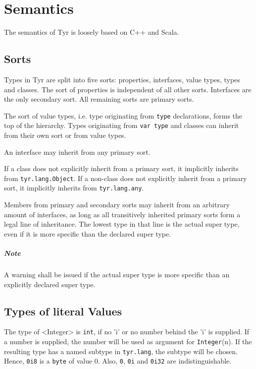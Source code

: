 \section{Semantics}

The semantics of Tyr is loosely based on C++ and Scala.

\subsection{Sorts}

Types in Tyr are split into five sorts: properties, interfaces, value types, types and classes.
The sort of properties is independent of all other sorts.
Interfaces are the only secondary sort.
All remaining sorts are primary sorts.

The sort of value types, i.e. type originating from \verb+type+ declarations, forms the top of the hierarchy.
Types originating from \verb+var type+ and classes can inherit from their own sort or from value types.

An interface may inherit from any primary sort.

If a class does not explicitly inherit from a primary sort, it implicitly inherits from \texttt{tyr.lang.Object}.
If a non-class does not explicitly inherit from a primary sort, it implicitly inherits from \texttt{tyr.lang.any}.

Members from primary and secondary sorts may inherit from an arbitrary amount of interfaces, as long as all transitively inherited primary sorts form a legal line of inheritance.
The lowest type in that line is the actual super type, even if it is more specific than the declared super type.

\subparagraph{Note} A warning shall be issued if the actual super type is more specific than an explicitly declared super type.



%


\subsection{Types of literal Values}

The type of <Integer> is \texttt{int}, if no 'i' or no number behind the 'i' is supplied.
If a number is supplied, the number will be used as argument for \texttt{Integer}(n).
If the resulting type has a named subtype in \texttt{tyr.lang}, the subtype will be chosen.
Hence, \texttt{0i8} is a \texttt{byte} of value 0.
Also, \texttt{0}, \texttt{0i} and \texttt{0i32} are indistinguishable.

